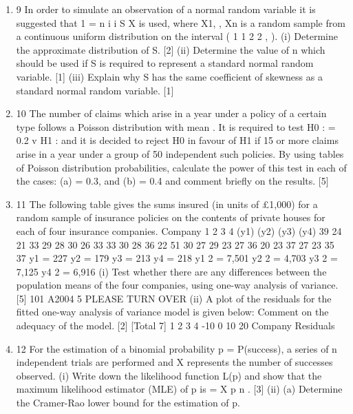 \documentclass[a4paper,12pt]{article}
\begin{document}
\begin{enumerate}
\item
9 In order to simulate an observation of a normal random variable it is suggested that
1
=
n
i
i
S X
is used, where X1, , Xn is a random sample from a continuous uniform distribution
on the interval ( 1 1
2 2 , ).
(i) Determine the approximate distribution of S. [2]
(ii) Determine the value of n which should be used if S is required to represent a
standard normal random variable. [1]
(iii) Explain why S has the same coefficient of skewness as a standard normal
random variable. [1]
\item 10 The number of claims which arise in a year under a policy of a certain type follows a
Poisson distribution with mean . It is required to test
H0 : = 0.2 v H1 :
and it is decided to reject H0 in favour of H1 if 15 or more claims arise in a year under
a group of 50 independent such policies.
By using tables of Poisson distribution probabilities, calculate the power of this test in
each of the cases:
(a) = 0.3, and
(b) = 0.4
and comment briefly on the results. [5]
\item 11 The following table gives the sums insured (in units of £1,000) for a random sample
of insurance policies on the contents of private houses for each of four insurance
companies.
Company
1 2 3 4
(y1) (y2) (y3) (y4)
39 24 21 33
29 28 30 26
33 33 30 28
36 22 51 30
27 29 23 27
36 20 23 37
27 23 35 37
y1 = 227 y2 = 179 y3 = 213 y4 = 218
y1
2 = 7,501 y2
2 = 4,703 y3
2 = 7,125 y4
2 = 6,916
(i) Test whether there are any differences between the population means of the
four companies, using one-way analysis of variance.
[5]
101 A2004 5 PLEASE TURN OVER
(ii) A plot of the residuals for the fitted one-way analysis of variance model is
given below:
Comment on the adequacy of the model. [2]
[Total 7]
1 2 3 4
-10
0
10
20
Company
Residuals
\item 12 For the estimation of a binomial probability p = P(success), a series of n independent
trials are performed and X represents the number of successes observed.
(i) Write down the likelihood function L(p) and show that the maximum
likelihood estimator (MLE) of p is =
X
p
n
.
[3]
(ii) (a) Determine the Cramer-Rao lower bound for the estimation of p.

\end{enumerate}
\end{document}
